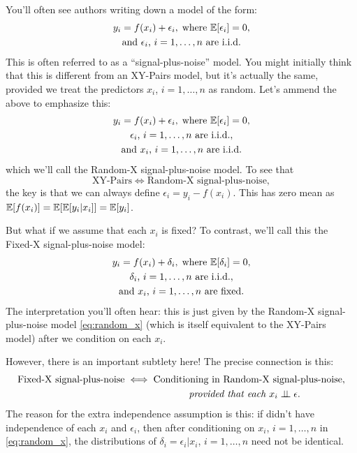 \documentclass{article}
\begin{document}
You'll often see authors writing down a model of the form:   
\begin{gather*}
y_i = f(x_i) + \epsilon_i, \; \text{where $\mathbb{E}[\epsilon_i] = 0$}, \\
\text{and $\epsilon_i$, $i=1,\dots,n$ are i.i.d.}  
\end{gather*}
This is often referred to as a ``signal-plus-noise'' model. You might initially
think that this is different from an XY-Pairs model, but it's actually the same,
provided we treat the predictors $x_i$, $i=1,\dots,n$ as random. Let's ammend 
the above to emphasize this:  
\begin{equation}
\begin{gathered}
\label{eq:random_x}
y_i = f(x_i) + \epsilon_i, \; \text{where $\mathbb{E}[\epsilon_i] = 0$}, \\
\text{$\epsilon_i$, $i=1,\dots,n$ are i.i.d.}, \\
\text{and $x_i$, $i=1,\dots,n$ are i.i.d.}  
\end{gathered}
\end{equation}
which we'll call the Random-X signal-plus-noise model. To see that
\[
\text{XY-Pairs} \iff \text{Random-X signal-plus-noise},
\]
the key is that we can always define $\epsilon_i = y_i - f(x_i)$. This has zero
mean as $\mathbb{E}[f(x_i)] = \mathbb{E}[\mathbb{E}[y_i|x_i]] = \mathbb{E}[y_i]$.   

But what if we assume that each $x_i$ is fixed? To contrast, we'll call this the
Fixed-X signal-plus-noise model: 
\begin{equation}
\begin{gathered}
\label{eq:fixed_x}
y_i = f(x_i) + \delta_i, \; \text{where $\mathbb{E}[\delta_i] = 0$}, \\
\text{$\delta_i$, $i=1,\dots,n$ are i.i.d.}, \\  
\text{and $x_i$, $i=1,\dots,n$ are fixed.}   
\end{gathered}
\end{equation}
The interpretation you'll often hear: this is just given by the Random-X 
signal-plus-noise model \eqref{eq:random_x} (which is itself equivalent to the
XY-Pairs model) after we condition on each $x_i$.          

However, there is an important subtlety here! The precise connection is this: 
\begin{gather*}
\text{Fixed-X signal-plus-noise} \iff \text{Conditioning in Random-X
  signal-plus-noise}, \\  
\hspace{130pt} \text{\emph{provided that each $x_i \indep \epsilon$}}.  
\end{gather*}
The reason for the extra independence assumption is this: if didn't have
independence of each $x_i$ and $\epsilon_i$, then after conditioning on $x_i$,
$i=1,\dots,n$ in \eqref{eq:random_x}, the distributions of $\delta_i =
\epsilon_i | x_i$, $i=1,\dots,n$ need not be identical.  
\end{document}
